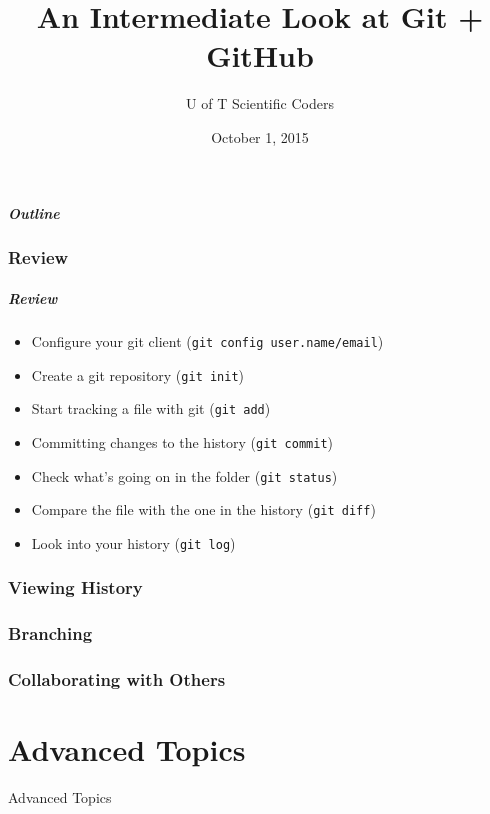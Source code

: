 \documentclass{beamer}
\author{U of T Scientific Coders}
\title{An Intermediate Look at Git + GitHub}
\institute{University of Toronto}
\date{October 1, 2015}
\begin{document}
\begin{frame}
 \titlepage
\end{frame}

\begin{frame}
 \frametitle{Outline}
 \tableofcontents
\end{frame}

\section{Review}

\begin{frame}
 \frametitle{Review}

 \begin{itemize}
  \item Configure your git client (\texttt{git config user.name/email})
  \item Create a git repository (\texttt{git init})
  \pause
  \item Start tracking a file with git (\texttt{git add})
  \item Committing changes to the history (\texttt{git commit})
  \pause
  \item Check what's going on in the folder (\texttt{git status})
  \item Compare the file with the one in the history (\texttt{git diff})
  \item Look into your history (\texttt{git log})
 \end{itemize}
\end{frame}

\section{Viewing History}

\section{Branching}

\section{Collaborating with Others}

\part{Advanced Topics}

\begin{frame}[plain]
 \vfill
 \begin{center}
  \LARGE \color{solarizedAccent} Advanced Topics
 \end{center}
 \vfill
\end{frame}
\end{document}
